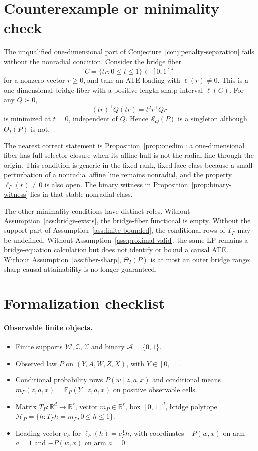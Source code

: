 \documentclass[11pt]{article}
\newcommand{\E}{\mathbb{E}}
\newcommand{\transpose}{\mathsf{T}}
\newcommand{\calH}{\mathcal{H}}
\newcommand{\R}{\mathbb{R}}
\theoremstyle{definition}
\theoremstyle{plain}
\theoremstyle{remark}
\begin{document}
\section{Counterexample or minimality check}
The unqualified one-dimensional part of Conjecture~\ref{conj:penalty-separation}
fails without the nonradial condition.  Consider the bridge fiber
\[
  C=\{tr:0\le t\le1\}\subset[0,1]^d
\]
for a nonzero vector \(r\ge0\), and take an ATE loading with
\(\ell(r)\neq0\).  This is a one-dimensional bridge fiber with a
positive-length sharp interval \(\ell(C)\).  For any \(Q\succ0\),
\[
  (tr)^\transpose Q(tr)=t^2 r^\transpose Qr
\]
is minimized at \(t=0\), independent of \(Q\).  Hence
\(\mathcal S_Q(P)\) is a singleton although \(\Theta_I(P)\) is not.

The nearest correct statement is Proposition~\ref{prop:onedim}: a
one-dimensional fiber has full selector closure when its affine hull is not
the radial line through the origin.  This condition is generic in the
fixed-rank, fixed-face class because a small perturbation of a nonradial
affine line remains nonradial, and the property \(\ell_P(r)\neq0\) is also
open.  The binary witness in Proposition~\ref{prop:binary-witness} lies in
that stable nonradial class.

The other minimality conditions have distinct roles.  Without
Assumption~\ref{ass:bridge-exists}, the bridge-fiber functional is empty.
Without the support part of Assumption~\ref{ass:finite-bounded}, the
conditional rows of \(T_P\) may be undefined.  Without
Assumption~\ref{ass:proximal-valid}, the same LP remains a bridge-equation
calculation but does not identify or bound a causal ATE.  Without
Assumption~\ref{ass:fiber-sharp}, \(\Theta_I(P)\) is at most an outer bridge
range; sharp causal attainability is no longer guaranteed.

\section{Formalization checklist}
\paragraph{Observable finite objects.}
\begin{itemize}[leftmargin=*]
\item Finite supports \(\mathcal W,\mathcal Z,\mathcal X\) and binary
\(\mathcal A=\{0,1\}\).
\item Observed law \(P\) on \((Y,A,W,Z,X)\), with \(Y\in[0,1]\).
\item Conditional probability rows \(P(w\mid z,a,x)\) and conditional means
\(m_P(z,a,x)=\E_P(Y\mid z,a,x)\) on positive observable cells.
\item Matrix \(T_P:\R^d\to\R^r\), vector \(m_P\in\R^r\), box
\([0,1]^d\), bridge polytope \(\calH_P=\{h:T_Ph=m_P,0\le h\le1\}\).
\item Loading vector \(c_P\) for \(\ell_P(h)=c_P^\transpose h\), with
coordinates \(+P(w,x)\) on arm \(a=1\) and \(-P(w,x)\) on arm \(a=0\).
\end{itemize}
\end{document}
